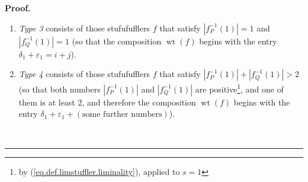 \documentclass[numbers=enddot,12pt,final,onecolumn,notitlepage]{scrartcl}%
\theoremstyle{definition}
\newenvironment{proof}[1][Proof]{\noindent\textbf{#1.} }{\ \rule{0.5em}{0.5em}}
\begin{document}
\begin{proof}
\begin{enumerate}
\item \textit{Type 3} consists of those stufufufflers $f$ that satisfy
$\left\vert f_{P}^{-1}\left(  1\right)  \right\vert =1$ and $\left\vert
f_{Q}^{-1}\left(  1\right)  \right\vert =1$ (so that the composition
$\operatorname*{wt}\left(  f\right)  $ begins with the entry $\delta
_{1}+\varepsilon_{1}=i+j$).

\item \textit{Type 4} consists of those stufufufflers $f$ that satisfy
$\left\vert f_{P}^{-1}\left(  1\right)  \right\vert +\left\vert f_{Q}%
^{-1}\left(  1\right)  \right\vert >2$ (so that both numbers $\left\vert
f_{P}^{-1}\left(  1\right)  \right\vert $ and $\left\vert f_{Q}^{-1}\left(
1\right)  \right\vert $ are positive\footnote{by
(\ref{eq.def.limstuffler.liminality}), applied to $s=1$}, and one of them is
at least $2$, and therefore the composition $\operatorname*{wt}\left(
f\right)  $ begins with the entry $\delta_{1}+\varepsilon_{1}+\left(
\text{some further numbers}\right)  $).
\end{enumerate}


\end{proof}
\end{document}
